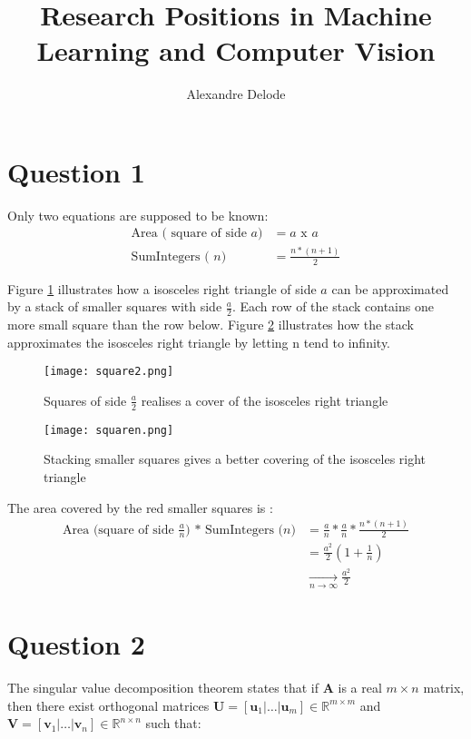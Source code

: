 \documentclass{article}
\title{Research Positions in Machine Learning and Computer Vision}
\author{Alexandre Delode}
\begin{document}
\maketitle

\section{Question 1}
Only two equations are supposed to be known:
\begin{align*}
\text{Area ( square of side }a) &= a \text{ x } a\\
\text{SumIntegers ( }n ) &= \frac{n*(n+1)}{2}
\end{align*}

Figure \ref{fig:square2} illustrates how a isosceles right triangle of side $a$ can be approximated by a stack of smaller squares with side $\frac{a}{2}$. Each row of the stack contains one more small square than the row below. Figure \ref{fig:squaren} illustrates how the stack approximates the isosceles right triangle by letting n tend to infinity.
\begin{figure}
\centering
\texttt{[image: square2.png]}
\caption{\label{fig:square2}Squares of side $\frac{a}{2}$ realises a cover of the isosceles right triangle}
\end{figure}
\begin{figure}
\centering
\texttt{[image: squaren.png]}
\caption{\label{fig:squaren}Stacking smaller squares gives a better covering of the isosceles right triangle}
\end{figure}
The area covered by the red smaller squares is :
\begin{align*}
\text{Area (square of side }\frac{a}{n})\text{ * SumIntegers (}n) 
&= \frac{a}{n}*\frac{a}{n}*\frac{n*(n+1)}{2}  \\
&= \frac{a^{2}}{2}(1+\frac{1}{n})\\
&\xrightarrow[n \to \infty]{} \frac{a^{2}}{2}
\end{align*}
\section{Question 2}

The singular value decomposition theorem states that if $\mathbf{A}$ is a real $m \times n$ matrix, then there exist orthogonal matrices $\mathbf{U} = [\mathbf{u}_1 | \dots | \mathbf{u}_m] \in \mathbb{R}^{m \times m}$ and $\mathbf{V} = [\mathbf{v}_1 | \dots | \mathbf{v}_n] \in \mathbb{R}^{n \times n}$ such that:
\end{document}
